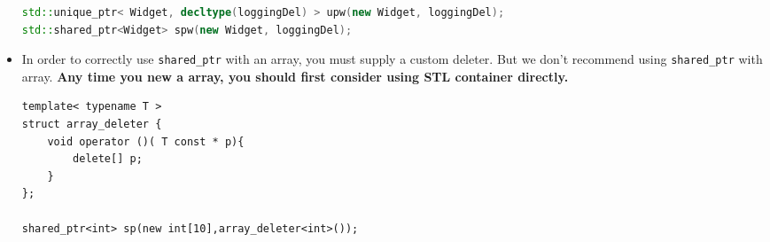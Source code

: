 \documentclass[a4paper,11pt,twoside]{book}
\begin{document}
\begin{itemize}
\begin{lstlisting}[frame=single, language=c++]
std::unique_ptr< Widget, decltype(loggingDel) > upw(new Widget, loggingDel);
std::shared_ptr<Widget> spw(new Widget, loggingDel);	
\end{lstlisting}

\item In order to correctly use \texttt{shared\_ptr} with an array, you must supply a custom deleter. But we don't recommend using \texttt{shared\_ptr} with array. \textbf{Any time you new a array, you should first consider using STL container directly.}
\begin{lstlisting}[numbers=none]
template< typename T >
struct array_deleter {
	void operator ()( T const * p){
		delete[] p;
	}
};

shared_ptr<int> sp(new int[10],array_deleter<int>());	
\end{lstlisting}

\end{itemize}
\end{document}
